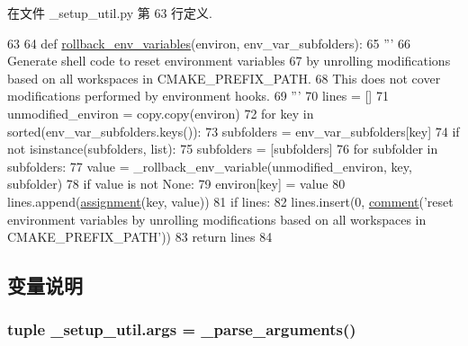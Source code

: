 在文件 \-\_\-setup\-\_\-util.\-py 第 63 行定义.


\begin{DoxyCode}
63 
64 \textcolor{keyword}{def }\hyperlink{namespace__setup__util_a5b1728beb6e19ccf126bf9e02de6083e}{rollback\_env\_variables}(environ, env\_var\_subfolders):
65     \textcolor{stringliteral}{'''}
66 \textcolor{stringliteral}{    Generate shell code to reset environment variables}
67 \textcolor{stringliteral}{    by unrolling modifications based on all workspaces in CMAKE\_PREFIX\_PATH.}
68 \textcolor{stringliteral}{    This does not cover modifications performed by environment hooks.}
69 \textcolor{stringliteral}{    '''}
70     lines = []
71     unmodified\_environ = copy.copy(environ)
72     \textcolor{keywordflow}{for} key \textcolor{keywordflow}{in} sorted(env\_var\_subfolders.keys()):
73         subfolders = env\_var\_subfolders[key]
74         \textcolor{keywordflow}{if} \textcolor{keywordflow}{not} isinstance(subfolders, list):
75             subfolders = [subfolders]
76         \textcolor{keywordflow}{for} subfolder \textcolor{keywordflow}{in} subfolders:
77             value = \_rollback\_env\_variable(unmodified\_environ, key, subfolder)
78             \textcolor{keywordflow}{if} value \textcolor{keywordflow}{is} \textcolor{keywordflow}{not} \textcolor{keywordtype}{None}:
79                 environ[key] = value
80                 lines.append(\hyperlink{namespace__setup__util_a7983d4ea2ecdeaf54e133950d8a76e77}{assignment}(key, value))
81     \textcolor{keywordflow}{if} lines:
82         lines.insert(0, \hyperlink{namespace__setup__util_a9d73115db9efca5c20b575f96b9eb065}{comment}(\textcolor{stringliteral}{'reset environment variables by unrolling modifications based on all
       workspaces in CMAKE\_PREFIX\_PATH'}))
83     \textcolor{keywordflow}{return} lines
84 

\end{DoxyCode}


\subsection{变量说明}
\hypertarget{namespace__setup__util_ac67cb2d93e0636936bcbeb363e2c87c3}{
\subsubsection[{args}]{\setlength{\rightskip}{0pt plus 5cm}tuple \-\_\-setup\-\_\-util.\-args = \-\_\-parse\-\_\-arguments()}}\label{namespace__setup__util_ac67cb2d93e0636936bcbeb363e2c87c3}


